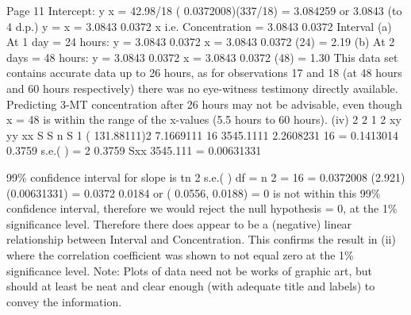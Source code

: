 Page 11
Intercept:
y x
= 42.98/18 ( 0.0372008)(337/18)
= 3.084259 or 3.0843 (to 4 d.p.)
y = x
= 3.0843 0.0372 x
i.e. Concentration = 3.0843 0.0372 Interval
(a) At 1 day = 24 hours:
y = 3.0843 0.0372 x
= 3.0843 0.0372 (24)
= 2.19
(b) At 2 days = 48 hours:
y = 3.0843 0.0372 x
= 3.0843 0.0372 (48)
= 1.30
This data set contains accurate data up to 26 hours, as for observations 17 and
18 (at 48 hours and 60 hours respectively) there was no eye-witness testimony
directly available. Predicting 3-MT concentration after 26 hours may not be
advisable, even though x = 48 is within the range of the x-values (5.5 hours to
60 hours).
(iv)
2
2 1
2
xy
yy
xx
S
S
n S
1 ( 131.88111)2
7.1669111
16 3545.1111
2.2608231
16
= 0.1413014
0.3759
s.e.( ) =
2 0.3759
Sxx 3545.111
= 0.00631331

99\% confidence interval for slope is tn 2 s.e.( ) df = n 2 = 16
= 0.0372008 (2.921) (0.00631331)
= 0.0372 0.0184
or ( 0.0556, 0.0188)
= 0 is not within this 99\% confidence interval, therefore we would reject the
null hypothesis = 0, at the 1\% significance level.
Therefore there does appear to be a (negative) linear relationship between
Interval and Concentration.
This confirms the result in (ii) where the correlation coefficient was shown to
not equal zero at the 1\% significance level.
Note: Plots of data need not be works of graphic art, but should at least be neat and clear
enough (with adequate title and labels) to convey the information.
